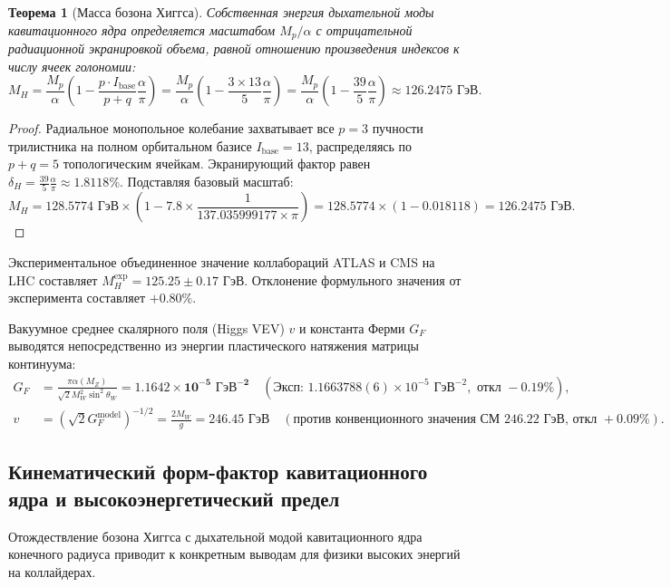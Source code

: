 \documentclass[11pt,a4paper]{article}
\newtheorem{theorem}{Теорема}[section]
\theoremstyle{definition}
\theoremstyle{remark}
\begin{document}
\begin{theorem}[Масса бозона Хиггса]
Собственная энергия дыхательной моды кавитационного ядра определяется масштабом $M_p/\alpha$ с отрицательной радиационной экранировкой объема, равной отношению произведения индексов к числу ячеек голономии:
\begin{equation}
    M_H = \frac{M_p}{\alpha} \left( 1 - \frac{p \cdot I_{\mathrm{base}}}{p+q} \frac{\alpha}{\pi} \right) = \frac{M_p}{\alpha} \left( 1 - \frac{3 \times 13}{5} \frac{\alpha}{\pi} \right) = \frac{M_p}{\alpha} \left( 1 - \frac{39}{5} \frac{\alpha}{\pi} \right) \approx \mathbf{126.2475\text{ ГэВ}}.
    \label{eq:higgs_mass_exact}
\end{equation}
\end{theorem}

\begin{proof}
Радиальное монопольное колебание захватывает все $p=3$ пучности трилистника на полном орбитальном базисе $I_{\mathrm{base}} = 13$, распределяясь по $p+q=5$ топологическим ячейкам. Экранирующий фактор равен $\delta_H = \frac{39}{5}\frac{\alpha}{\pi} \approx 1.8118\%$. Подставляя базовый масштаб:
\begin{equation}
    M_H = 128.5774\text{ ГэВ} \times \left( 1 - 7.8 \times \frac{1}{137.035999177 \times \pi} \right) = 128.5774 \times (1 - 0.018118) = \mathbf{126.2475\text{ ГэВ}}.
\end{equation}
\end{proof}
Экспериментальное объединенное значение коллабораций ATLAS и CMS на LHC составляет $M_H^{\mathrm{exp}} = 125.25 \pm 0.17\text{ ГэВ}$. Отклонение формульного значения от эксперимента составляет $+0.80\%$.

Вакуумное среднее скалярного поля (Higgs VEV) $v$ и константа Ферми $G_F$ выводятся непосредственно из энергии пластического натяжения матрицы континуума:
\begin{align}
    G_F &= \frac{\pi \alpha(M_Z)}{\sqrt{2} M_W^2 \sin^2\theta_W} = \mathbf{1.1642 \times 10^{-5}\text{ ГэВ}^{-2}} \quad (\text{Эксп: } 1.1663788(6) \times 10^{-5}\text{ ГэВ}^{-2}, \text{ откл } -0.19\%), \\
    v &= \left( \sqrt{2} G_F^{\mathrm{model}} \right)^{-1/2} = \frac{2 M_W}{g} = \mathbf{246.45\text{ ГэВ}} \quad (\text{против конвенционного значения СМ } 246.22\text{ ГэВ, откл } +0.09\%).
\end{align}

\subsection{Кинематический форм-фактор кавитационного ядра и высокоэнергетический предел}
Отождествление бозона Хиггса с дыхательной модой кавитационного ядра конечного радиуса приводит к конкретным выводам для физики высоких энергий на коллайдерах.
\end{document}
